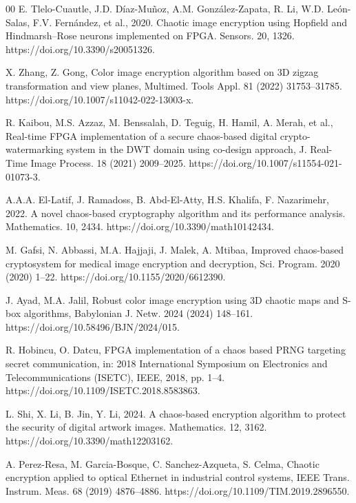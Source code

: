 \documentclass[preprint, 12pt, sort&compress]{elsarticle}
\begin{document}
\begin{thebibliography}{00}
E. Tlelo-Cuautle, J.D. Díaz-Muñoz, A.M. González-Zapata, R. Li, W.D. León-Salas, F.V. Fernández, et al., 2020. Chaotic image encryption using Hopfield and Hindmarsh–Rose neurons implemented on FPGA. Sensors. 20, 1326. https://doi.org/10.3390/s20051326.

X. Zhang, Z. Gong, Color image encryption algorithm based on 3D zigzag transformation and view planes, Multimed. Tools Appl. 81 (2022) 31753–31785. https://doi.org/10.1007/s11042-022-13003-x.

R. Kaibou, M.S. Azzaz, M. Benssalah, D. Teguig, H. Hamil, A. Merah, et al., Real-time FPGA implementation of a secure chaos-based digital crypto-watermarking system in the DWT domain using co-design approach, J. Real-Time Image Process. 18 (2021) 2009–2025. https://doi.org/10.1007/s11554-021-01073-3.

A.A.A. El-Latif, J. Ramadoss, B. Abd-El-Atty, H.S. Khalifa, F. Nazarimehr, 2022. A novel chaos-based cryptography algorithm and its performance analysis. Mathematics. 10, 2434. https://doi.org/10.3390/math10142434.

M. Gafsi, N. Abbassi, M.A. Hajjaji, J. Malek, A. Mtibaa, Improved chaos-based cryptosystem for medical image encryption and decryption, Sci. Program. 2020 (2020) 1–22. https://doi.org/10.1155/2020/6612390.

J. Ayad, M.A. Jalil, Robust color image encryption using 3D chaotic maps and S-box algorithms, Babylonian J. Netw. 2024 (2024) 148–161. https://doi.org/10.58496/BJN/2024/015.

R. Hobincu, O. Datcu, FPGA implementation of a chaos based PRNG targeting secret communication, in: 2018 International Symposium on Electronics and Telecommunications (ISETC), IEEE, 2018, pp. 1–4. https://doi.org/10.1109/ISETC.2018.8583863.

L. Shi, X. Li, B. Jin, Y. Li, 2024. A chaos-based encryption algorithm to protect the security of digital artwork images. Mathematics. 12, 3162. https://doi.org/10.3390/math12203162.

A. Perez-Resa, M. Garcia-Bosque, C. Sanchez-Azqueta, S. Celma, Chaotic encryption applied to optical Ethernet in industrial control systems, IEEE Trans. Instrum. Meas. 68 (2019) 4876–4886. https://doi.org/10.1109/TIM.2019.2896550.


\end{thebibliography}
\end{document}
